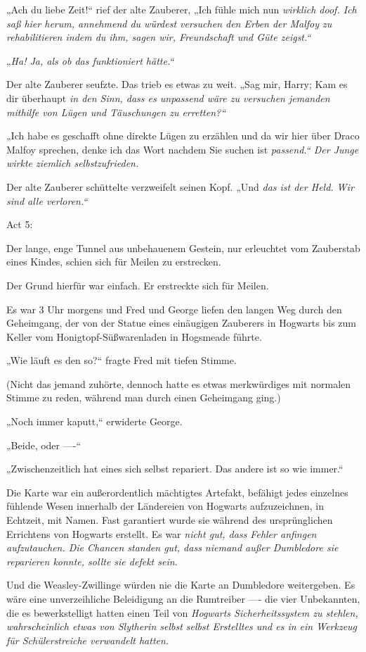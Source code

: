 {„Ach du liebe Zeit!“ rief der alte Zauberer, „Ich fühle mich nun \emph{wirklich doof. Ich saß hier herum, annehmend du würdest versuchen den Erben der Malfoy zu rehabilitieren indem du ihm, sagen wir, \emph{Freundschaft und Güte zeigst.“}}

„\emph{Ha! Ja, als ob \emph{das} funktioniert hätte.“}

Der alte Zauberer seufzte. Das trieb es etwas zu weit. „Sag mir, Harry; Kam es dir überhaupt \emph{in den Sinn, dass es unpassend wäre zu versuchen jemanden mithilfe von Lügen und Täuschungen zu erretten?“}

„Ich habe es geschafft ohne direkte Lügen zu erzählen und da wir hier über Draco Malfoy sprechen, denke ich das Wort nachdem Sie suchen ist \emph{passend.“ Der Junge wirkte ziemlich selbstzufrieden.}

Der alte Zauberer schüttelte verzweifelt seinen Kopf. „Und \emph{das ist der Held. Wir sind alle verloren.“}

Act 5:

Der lange, enge Tunnel aus unbehauenem Gestein, nur erleuchtet vom Zauberstab eines Kindes, schien sich für Meilen zu erstrecken.

Der Grund hierfür war einfach. Er erstreckte sich für Meilen.

Es war 3 Uhr morgens und Fred und George liefen den langen Weg durch den Geheimgang, der von der Statue eines einäugigen Zauberers in Hogwarts bis zum Keller vom Honigtopf-Süßwarenladen in Hogsmeade führte.

„Wie läuft es den so?“ fragte Fred mit tiefen Stimme.

(Nicht das jemand zuhörte, dennoch hatte es etwas merkwürdiges mit normalen Stimme zu reden, während man durch einen Geheimgang ging.)

„Noch immer kaputt,“ erwiderte George.

„Beide, oder ----“

„Zwischenzeitlich hat eines sich selbst repariert. Das andere ist so wie immer.“

Die Karte war ein außerordentlich mächtigtes Artefakt, befähigt jedes einzelnes fühlende Wesen innerhalb der Ländereien von Hogwarts aufzuzeichnen, in Echtzeit, mit Namen. Fast garantiert wurde sie während des ursprünglichen Errichtens von Hogwarts erstellt. Es war \emph{nicht gut, dass Fehler anfingen aufzutauchen. Die Chancen standen gut, dass niemand außer Dumbledore sie reparieren konnte, sollte sie defekt sein.}

Und die Weasley-Zwillinge würden nie die Karte an Dumbledore weitergeben. Es wäre eine unverzeihliche Beleidigung an die Rumtreiber ---- die vier Unbekannten, die es bewerkstelligt hatten einen Teil von \emph{Hogwarts Sicherheitssystem zu stehlen, wahrscheinlich etwas von Slytherin selbst selbst Erstelltes und es in ein \emph{Werkzeug für Schülerstreiche} verwandelt hatten.}

}
